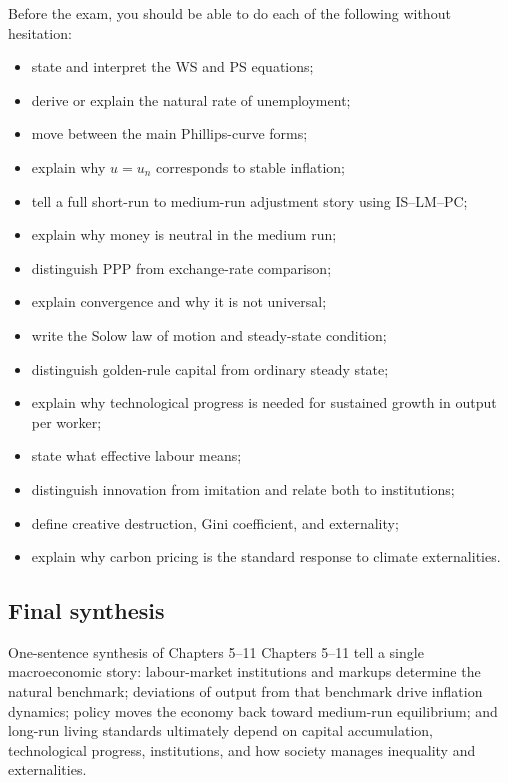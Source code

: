 \documentclass[12pt]{article}
\begin{document}
\begin{examtip}[title={Exam Focus: Final checklist}]
Before the exam, you should be able to do each of the following without hesitation:
\begin{itemize}[leftmargin=1.5em]
    \item state and interpret the WS and PS equations;
    \item derive or explain the natural rate of unemployment;
    \item move between the main Phillips-curve forms;
    \item explain why $u=u_n$ corresponds to stable inflation;
    \item tell a full short-run to medium-run adjustment story using IS--LM--PC;
    \item explain why money is neutral in the medium run;
    \item distinguish PPP from exchange-rate comparison;
    \item explain convergence and why it is not universal;
    \item write the Solow law of motion and steady-state condition;
    \item distinguish golden-rule capital from ordinary steady state;
    \item explain why technological progress is needed for sustained growth in output per worker;
    \item state what effective labour means;
    \item distinguish innovation from imitation and relate both to institutions;
    \item define creative destruction, Gini coefficient, and externality;
    \item explain why carbon pricing is the standard response to climate externalities.
\end{itemize}
\end{examtip}

\subsection{Final synthesis}

\begin{theorem}{One-sentence synthesis of Chapters 5--11}{}
Chapters 5--11 tell a single macroeconomic story: labour-market institutions and markups determine the natural benchmark; deviations of output from that benchmark drive inflation dynamics; policy moves the economy back toward medium-run equilibrium; and long-run living standards ultimately depend on capital accumulation, technological progress, institutions, and how society manages inequality and externalities.
\end{theorem}
\end{document}
